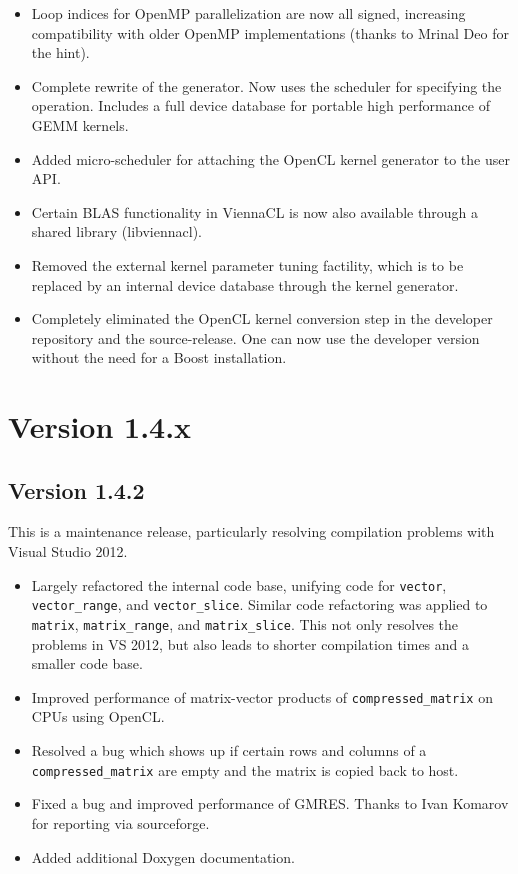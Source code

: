 \begin{itemize}
 \item Loop indices for OpenMP parallelization are now all signed, increasing compatibility with older OpenMP implementations (thanks to Mrinal Deo for the hint).
 \item Complete rewrite of the generator. Now uses the scheduler for specifying the operation. Includes a full device database for portable high performance of GEMM kernels.
 \item Added micro-scheduler for attaching the OpenCL kernel generator to the user API.
 \item Certain BLAS functionality in ViennaCL is now also available through a shared library (libviennacl).
 \item Removed the external kernel parameter tuning factility, which is to be replaced by an internal device database through the kernel generator.
 \item Completely eliminated the OpenCL kernel conversion step in the developer repository and the source-release. One can now use the developer version without the need for a Boost installation.
\end{itemize}


\section*{Version 1.4.x}

\subsection*{Version 1.4.2}
This is a maintenance release, particularly resolving compilation problems with Visual Studio 2012.
\begin{itemize}
 \item Largely refactored the internal code base, unifying code for \lstinline|vector|, \lstinline|vector_range|, and \lstinline|vector_slice|.
       Similar code refactoring was applied to \lstinline|matrix|, \lstinline|matrix_range|, and \lstinline|matrix_slice|.
       This not only resolves the problems in VS 2012, but also leads to shorter compilation times and a smaller code base.
 \item Improved performance of matrix-vector products of \lstinline|compressed_matrix| on CPUs using OpenCL.
 \item Resolved a bug which shows up if certain rows and columns of a \lstinline|compressed_matrix| are empty and the matrix is copied back to host.
 \item Fixed a bug and improved performance of GMRES. Thanks to Ivan Komarov for reporting via sourceforge.
 \item Added additional Doxygen documentation.
\end{itemize}


